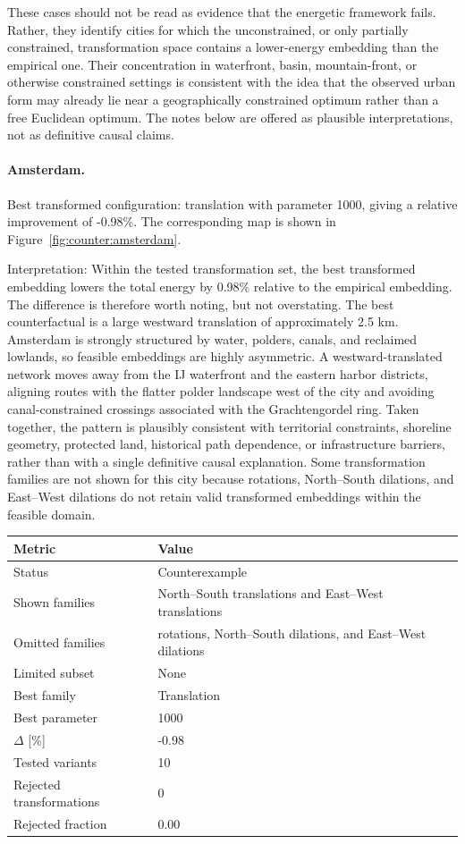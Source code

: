 \documentclass{article}
\begin{document}
These cases should not be read as evidence that the energetic framework fails. Rather, they identify cities for which the unconstrained, or only partially constrained, transformation space contains a lower-energy embedding than the empirical one. Their concentration in waterfront, basin, mountain-front, or otherwise constrained settings is consistent with the idea that the observed urban form may already lie near a geographically constrained optimum rather than a free Euclidean optimum. The notes below are offered as plausible interpretations, not as definitive causal claims.


\paragraph*{Amsterdam.}
Best transformed configuration: translation with parameter 1000, giving a relative improvement of -0.98\%. The corresponding map is shown in Figure~\ref{fig:counter:amsterdam}.

Interpretation: Within the tested transformation set, the best transformed embedding lowers the total energy by 0.98\% relative to the empirical embedding. The difference is therefore worth noting, but not overstating. The best counterfactual is a large westward translation of approximately 2.5 km. Amsterdam is strongly structured by water, polders, canals, and reclaimed lowlands, so feasible embeddings are highly asymmetric. A westward-translated network moves away from the IJ waterfront and the eastern harbor districts, aligning routes with the flatter polder landscape west of the city and avoiding canal-constrained crossings associated with the Grachtengordel ring. Taken together, the pattern is plausibly consistent with territorial constraints, shoreline geometry, protected land, historical path dependence, or infrastructure barriers, rather than with a single definitive causal explanation.
Some transformation families are not shown for this city because rotations, North--South dilations, and East--West dilations do not retain valid transformed embeddings within the feasible domain.


\begin{center}
\begin{tabular}{p{}p{}}
\toprule
Metric & Value \\
\midrule
Status & Counterexample \\
Shown families & North--South translations and East--West translations \\
Omitted families & rotations, North--South dilations, and East--West dilations \\
Limited subset & None \\
Best family & Translation \\
Best parameter & 1000 \\
$\Delta$ [\%] & -0.98 \\
Tested variants & 10 \\
Rejected transformations & 0 \\
Rejected fraction & 0.00 \\
\bottomrule
\end{tabular}
\end{center}
\end{document}
